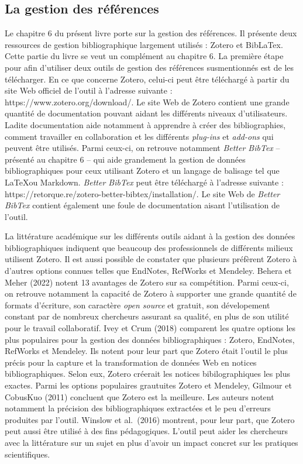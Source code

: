 \documentclass[
  letterpaper,
  DIV=11,
  numbers=noendperiod]{scrreprt}
\begin{document}
\subsection{La gestion des
références}\label{la-gestion-des-ruxe9fuxe9rences}

Le chapitre 6 du présent livre porte sur la gestion des références. Il
présente deux ressources de gestion bibliographique largement utilisés :
Zotero et BibLaTex. Cette partie du livre se veut un complément au
chapitre 6. La première étape pour afin d'utiliser deux outils de
gestion des références susmentionnés est de les télécharger. En ce que
concerne Zotero, celui-ci peut être téléchargé à partir du site Web
officiel de l'outil à l'adresse suivante :
https://www.zotero.org/download/. Le site Web de Zotero contient une
grande quantité de documentation pouvant aidant les différents niveaux
d'utilisateurs. Ladite documentation aide notamment à apprendre à créer
des bibliographies, comment travailler en collaboration et les
différents \emph{plug-ins} et \emph{add-ons} qui peuvent être utilisés.
Parmi ceux-ci, on retrouve notamment \emph{Better BibTex} -- présenté au
chapitre 6 -- qui aide grandement la gestion de données bibliographiques
pour ceux utilisant Zotero et un langage de balisage tel que \LaTeX ou
Markdown. \emph{Better BibTex} peut être téléchargé à l'adresse suivante
: https://retorque.re/zotero-better-bibtex/installation/. Le site Web de
\emph{Better BibTex} contient également une foule de documentation
aisant l'utilisation de l'outil.

La littérature académique sur les différents outils aidant à la gestion
des données bibliographiques indiquent que beaucoup des professionnels
de différents milieux utilisent Zotero. Il est aussi possible de
constater que plusieurs préfèrent Zotero à d'autres options connues
telles que EndNotes, RefWorks et Mendeley. Behera et Meher (2022) notent
13 avantages de Zotero sur sa compétition. Parmi ceux-ci, on retrouve
notamment la capacité de Zotero à supporter une grande quantité de
formats d'écriture, son caractère \emph{open source} et gratuit, son
dévelopement constant par de nombreux chercheurs assurant sa qualité, en
plus de son utilité pour le travail collaboratif. Ivey et Crum (2018)
comparent les quatre options les plus populaires pour la gestion des
données bibliographiques : Zotero, EndNotes, RefWorks et Mendeley. Ils
notent pour leur part que Zotero était l'outil le plus précis pour la
capture et la transformation de données Web en notices bibliographiques.
Selon eux, Zotero créerait les notices bibilographiques les plus
exactes. Parmi les options populaires grautuites Zotero et Mendeley,
Gilmour et CobusKuo (2011) concluent que Zotero est la meilleure. Les
auteurs notent notamment la précision des bibliographiques extractées et
le peu d'erreurs produites par l'outil. Winslow et al.~(2016) montrent,
pour leur part, que Zotero peut aussi être utilisé à des fins
pédagogiques. L'outil peut aider les chercheurs avec la littérature sur
un sujet en plus d'avoir un impact concret sur les pratiques
scientifiques.
\end{document}
